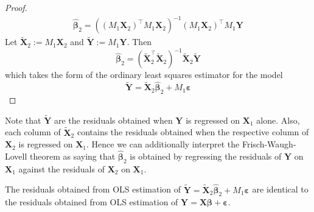 \documentclass[11pt]{report} %
\begin{document}
\begin{proof}
\begin{gather}
\widehat{\boldsymbol{\beta}}_{2}=\left(\left(M_{1}\mathbf{X}_{2}\right)^{\top}M_{1}\mathbf{X}_{2}\right)^{-1}\left(M_{1}\mathbf{X}_{2}\right)^{\top}M_{1}\mathbf{Y}
\end{gather}
Let $\widetilde{\mathbf{X}}_{2} := M_{1}\mathbf{X}_{2}$ and $\widetilde{\mathbf{Y}} := M_{1}\mathbf{Y}$. Then
\begin{equation}
\widehat{\boldsymbol{\beta}}_{2}=\left(\widetilde{\mathbf{X}}_{2}^{\top}\widetilde{\mathbf{X}}_{2}\right)^{-1}\widetilde{\mathbf{X}}_{2}\widetilde{\mathbf{Y}}
\end{equation}
which takes the form of the ordinary least squares estimator for the model
\begin{equation}
\widetilde{\mathbf{Y}}=\widetilde{\mathbf{X}}_{2}\widehat{\boldsymbol{\beta}}_{2}+M_{1}\boldsymbol{\varepsilon}
\end{equation}
\end{proof}
Note that $\widetilde{\mathbf{Y}}$ are the residuals obtained when $\mathbf{Y}$ is regressed on $\mathbf{X}_{1}$ alone. Also, each column of $\widetilde{\mathbf{X}}_{2}$ contains the residuals obtained when the respective column of $\mathbf{X}_{2}$ is regressed on $\mathbf{X}_{1}$. Hence we can additionally interpret the Frisch-Waugh-Lovell theorem as saying that $\widehat{\boldsymbol{\beta}}_{2}$ is obtained by regressing the residuals of $\mathbf{Y}$ on $\mathbf{X}_{1}$ against the residuals of $\mathbf{X}_{2}$ on $\mathbf{X}_{1}$.
\begin{corollary}
The residuals obtained from OLS estimation of $\widetilde{\mathbf{Y}}=\widetilde{\mathbf{X}}_{2}\widehat{\boldsymbol{\beta}}_{2}+M_{1}\boldsymbol{\varepsilon}$ are identical to the residuals obtained from OLS estimation of $\mathbf{Y} = \mathbf{X}\boldsymbol{\beta} + \boldsymbol{\varepsilon}$.
\end{corollary}
\end{document}
